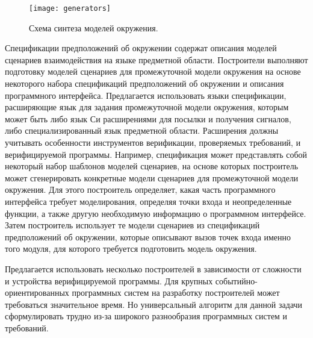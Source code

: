 \begin{figure}
\centering
\texttt{[image: generators]}
\caption{Схема синтеза моделей окружения.}
\label{figure:em}
\end{figure}

Спецификации предположений об окружении содержат описания моделей сценариев взаимодействия на языке предметной области.
Построители выполняют подготовку моделей сценариев для промежуточной модели окружения на основе некоторого набора спецификаций предположений об окружении и описания программного интерфейса.
Предлагается использовать языки спецификации, расширяющие язык для задания промежуточной модели окружения, которым может быть либо язык Си расширениями для посылки и получения сигналов, либо специализированный язык предметной области.
Расширения должны учитывать особенности инструментов верификации, проверяемых требований, и верифицируемой программы.
Например, спецификация может представлять собой некоторый набор шаблонов моделей сценариев, на основе которых построитель может сгенерировать конкретные модели сценариев для промежуточной модели окружения. 
Для этого построитель определяет, какая часть программного интерфейса требует моделирования, определяя точки входа и неопределенные функции, а также другую необходимую информацию о программном интерфейсе.
Затем построитель использует те модели сценариев из спецификаций предположений об окружении, которые описывают вызов точек входа именно того модуля, для которого требуется подготовить модель окружения.

Предлагается использовать несколько построителей в зависимости от сложности и устройства верифицируемой программы.
Для крупных событийно-ориентированных программных систем на разработку построителей может требоваться значительное время.
Но универсальный алгоритм для данной задачи сформулировать трудно из-за широкого разнообразия программных систем и требований.

